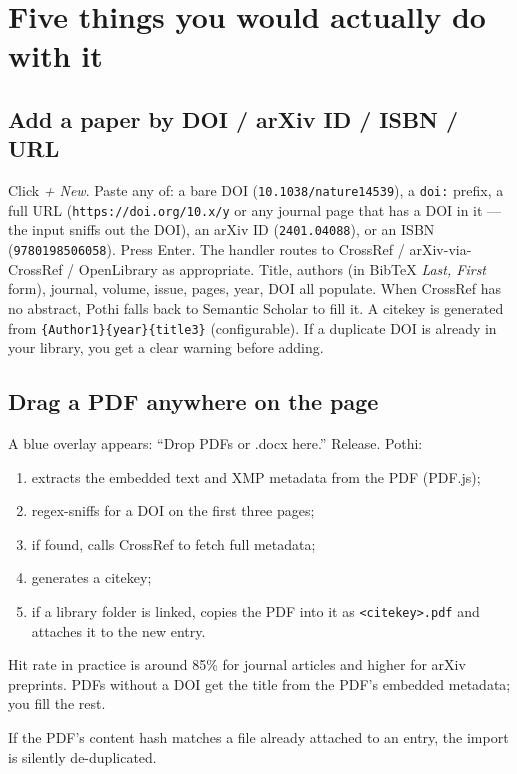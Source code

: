 \documentclass[11pt]{article}
\begin{document}
\section{Five things you would actually do with it}

\subsection{Add a paper by DOI / arXiv ID / ISBN / URL}

Click \emph{+ New}. Paste any of: a bare DOI (\texttt{10.1038/nature14539}),
a \texttt{doi:} prefix, a full URL (\texttt{https://doi.org/10.x/y} or any
journal page that has a DOI in it --- the input sniffs out the DOI), an arXiv
ID (\texttt{2401.04088}), or an ISBN (\texttt{9780198506058}). Press Enter.
The handler routes to CrossRef / arXiv-via-CrossRef / OpenLibrary as
appropriate. Title, authors (in BibTeX \emph{Last, First} form), journal,
volume, issue, pages, year, DOI all populate. When CrossRef has no abstract,
Pothi falls back to Semantic Scholar to fill it. A citekey is generated from
\texttt{\{Author1\}\{year\}\{title3\}} (configurable). If a duplicate DOI is
already in your library, you get a clear warning before adding.

\subsection{Drag a PDF anywhere on the page}

A blue overlay appears: ``Drop PDFs or .docx here.'' Release. Pothi:
\begin{enumerate}
\item extracts the embedded text and XMP metadata from the PDF (PDF.js);
\item regex-sniffs for a DOI on the first three pages;
\item if found, calls CrossRef to fetch full metadata;
\item generates a citekey;
\item if a library folder is linked, copies the PDF into it as
      \texttt{<citekey>.pdf} and attaches it to the new entry.
\end{enumerate}
Hit rate in practice is around 85\% for journal articles and higher for
arXiv preprints. PDFs without a DOI get the title from the PDF's embedded
metadata; you fill the rest.

If the PDF's content hash matches a file already attached to an entry, the
import is silently de-duplicated.
\end{document}
